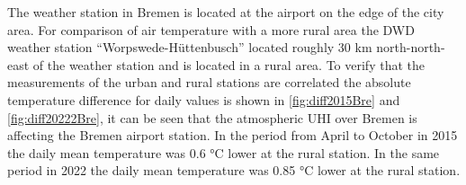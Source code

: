 \documentclass[12pt,a4paper, english,twoside]{article}
\begin{document}
      The weather station in Bremen is located at the airport on the edge of the city area. %
      For comparison of air temperature with a more rural area the \gls{DWD} weather station ``Worpswede-Hüttenbusch'' located roughly 30 km north-north-east of the weather station and is located in a rural area. 
      To verify that the measurements of the urban and rural stations are correlated the absolute temperature difference for daily values is shown in \cref{fig:diff2015Bre} and \cref{fig:diff20222Bre}, it can be seen that the atmospheric \gls{UHI} over Bremen is affecting the Bremen airport station. 
      In the period from April to October in 2015 the daily mean temperature was 0.6 °C lower at the rural station. 
      In the same period in 2022 the daily mean temperature was 0.85 °C lower at the rural station. 
\end{document}
